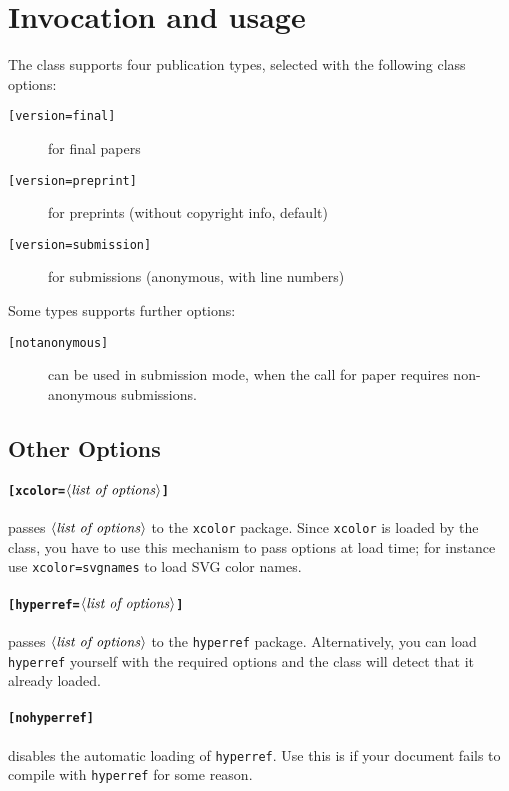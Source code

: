 \documentclass{iacrcc}
\begin{document}
\section{Invocation and usage}

The class supports four publication types, selected with the
following class options:
\begin{description}
\item[\texttt{[version=final]}] for final papers
\item[\texttt{[version=preprint]}] for preprints (without copyright info, default)
\item[\texttt{[version=submission]}] for submissions (anonymous, with line numbers)
\end{description}
Some types supports further options:
\begin{description}
\item[\texttt{[notanonymous]}] can be used in submission mode, when the
  call for paper requires non-anonymous submissions.
\end{description}

\subsection{Other Options}

\paragraph{\texttt{[xcolor=$\langle\text{\emph{list of options}}\rangle$]}}
passes $\langle\text{\emph{list of options}}\rangle$ to the
\texttt{xcolor} package.  Since \texttt{xcolor} is loaded by the class,
you have to use this mechanism to pass options at load time; for instance
use \texttt{xcolor=svgnames} to load SVG color names.

\paragraph{\texttt{[hyperref=$\langle\text{\emph{list of options}}\rangle$]}}
passes $\langle\text{\emph{list of options}}\rangle$ to the
\texttt{hyperref} package.  Alternatively, you can load
\texttt{hyperref} yourself with the required options and the class will
detect that it already loaded.

\paragraph{\texttt{[nohyperref]}}
disables the automatic loading of
\texttt{hyperref}.  Use this is if your document fails to compile with
\texttt{hyperref} for some reason.
\end{document}
